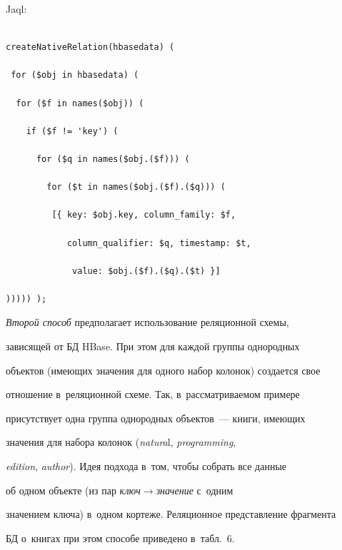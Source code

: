 Jaql:



\vspace*{-1pt}



\noindent

      \begin{verbatim}

createNativeRelation(hbasedata) (

 for ($obj in hbasedata) (

  for ($f in names($obj)) (

    if ($f != 'key') (

      for ($q in names($obj.($f))) (

        for ($t in names($obj.($f).($q))) (

         [{ key: $obj.key, column_family: $f,

            column_qualifier: $q, timestamp: $t,

             value: $obj.($f).($q).($t) }]

))))) );

\end{verbatim}



\vspace*{-1pt}





      \textit{Второй способ} предполагает использование реляционной схемы,

зависящей от БД HBase. При этом для каждой группы однородных

объектов (имеющих значения для одного набор колонок) создается свое

отношение в~реляционной схеме. Так, в~рассматриваемом примере

присутствует одна группа однородных объектов~--- книги, имеющих

значения для набора колонок (\textit{natura}l, \textit{programming},

\textit{edition}, \textit{author}). Идея подхода в~том, чтобы собрать все данные

об одном объекте (из пар \textit{ключ}\;$\to$\;\textit{зна\-че\-ние} с~одним

значением ключа) в~одном кортеже. Реляционное представление фрагмента

БД о~книгах при этом способе приведено в~табл.~6.



